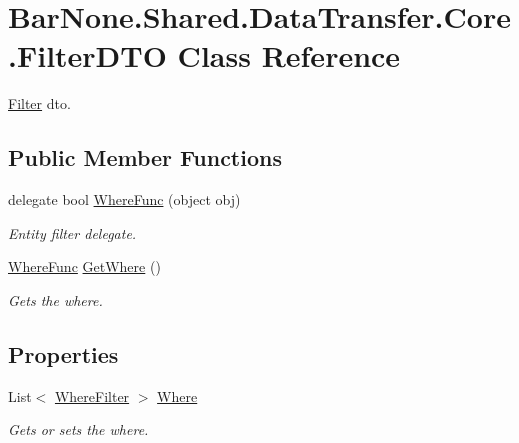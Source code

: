 \hypertarget{class_bar_none_1_1_shared_1_1_data_transfer_1_1_core_1_1_filter_d_t_o}{}\section{Bar\+None.\+Shared.\+Data\+Transfer.\+Core.\+Filter\+D\+TO Class Reference}
\label{class_bar_none_1_1_shared_1_1_data_transfer_1_1_core_1_1_filter_d_t_o}


\mbox{\hyperlink{namespace_bar_none_1_1_shared_1_1_data_transfer_1_1_core_1_1_filter}{Filter}} dto.  


\subsection*{Public Member Functions}
\begin{DoxyCompactItemize}
\item 
delegate bool \mbox{\hyperlink{class_bar_none_1_1_shared_1_1_data_transfer_1_1_core_1_1_filter_d_t_o_abde020b2934ca1c07441a24e135c81e2}{Where\+Func}} (object obj)
\begin{DoxyCompactList}\small\item\em Entity filter delegate. \end{DoxyCompactList}\item 
\mbox{\hyperlink{class_bar_none_1_1_shared_1_1_data_transfer_1_1_core_1_1_filter_d_t_o_abde020b2934ca1c07441a24e135c81e2}{Where\+Func}} \mbox{\hyperlink{class_bar_none_1_1_shared_1_1_data_transfer_1_1_core_1_1_filter_d_t_o_a216f4f3b1a7c08fc7f158c13f18564f0}{Get\+Where}} ()
\begin{DoxyCompactList}\small\item\em Gets the where. \end{DoxyCompactList}\end{DoxyCompactItemize}
\subsection*{Properties}
\begin{DoxyCompactItemize}
\item 
List$<$ \mbox{\hyperlink{class_bar_none_1_1_shared_1_1_data_transfer_1_1_core_1_1_filter_1_1_where_filter}{Where\+Filter}} $>$ \mbox{\hyperlink{class_bar_none_1_1_shared_1_1_data_transfer_1_1_core_1_1_filter_d_t_o_a3422159feed69350637b219ab1369082}{Where}}
\begin{DoxyCompactList}\small\item\em Gets or sets the where. \end{DoxyCompactList}\end{DoxyCompactItemize}
